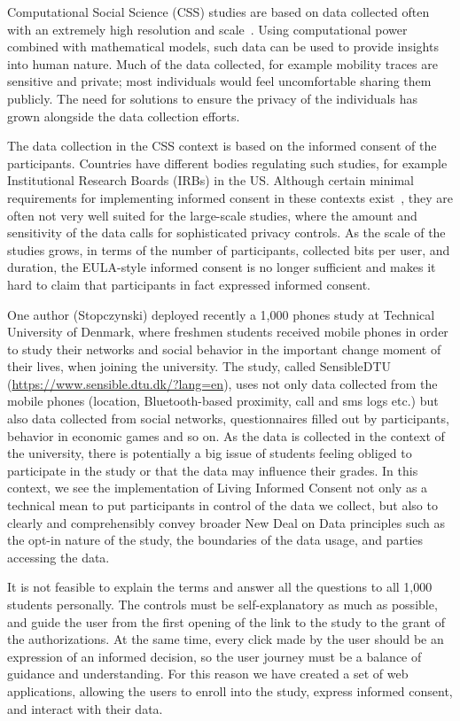 Computational Social Science (CSS) studies are based on data collected often with an extremely high resolution and scale~\cite{lazer2009life}.
Using computational power combined with mathematical models, such data can be used to provide insights into human nature.
Much of the data collected, for example mobility traces are sensitive and private; most individuals would feel uncomfortable sharing them publicly.
The need for solutions to ensure the privacy of the individuals has grown alongside the data collection efforts.

The data collection in the CSS context is based on the informed consent of the participants. 
Countries have different bodies regulating such studies, for example Institutional Research Boards (IRBs) in the US. Although certain minimal requirements for implementing informed consent in these contexts exist~\cite{IMM2013-06632}, they are often not very well suited for the large-scale studies, where the amount and sensitivity of the data calls for sophisticated privacy controls.
As the scale of the studies grows, in terms of the number of participants, collected bits per user, and duration, the EULA-style informed consent is no longer sufficient and makes it hard to claim that participants in fact expressed informed consent.

One author (Stopczynski) deployed recently a 1,000 phones study at Technical University of Denmark, where freshmen students received mobile phones in order to study their networks and social behavior in the important change moment of their lives, when joining the university.
The study, called SensibleDTU (\url{https://www.sensible.dtu.dk/?lang=en}), uses not only data collected from the mobile phones (location, Bluetooth-based proximity, call and sms logs etc.) but also data collected from social networks, questionnaires filled out by participants, behavior in economic games and so on.
As the data is collected in the context of the university, there is potentially a big issue of students feeling obliged to participate in the study or that the data may influence their grades.
In this context, we see the implementation of Living Informed Consent not only as a technical mean to put participants in control of the data we collect, but also to clearly and comprehensibly convey broader New Deal on Data principles such as the opt-in nature of the study, the boundaries of the data usage, and parties accessing the data.

It is not feasible to explain the terms and answer all the questions to all 1,000 students personally.
The controls must be self-explanatory as much as possible, and guide the user from the first opening of the link to the study to the grant of the authorizations.
At the same time, every click made by the user should be an expression of an informed decision, so the user journey must be a balance of guidance and understanding.
For this reason we have created a set of web applications, allowing the users to enroll into the study, express informed consent, and interact with their data.

